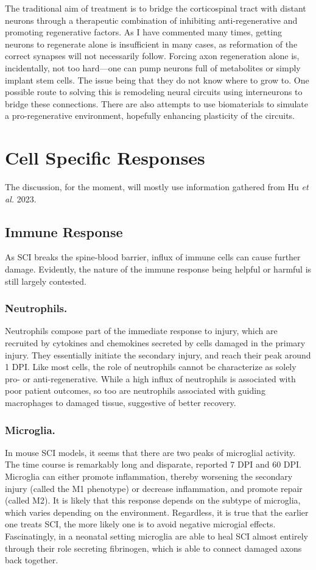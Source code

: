\documentclass[12pt]{report}
\begin{document}
The traditional aim of treatment is to bridge the corticospinal tract with distant neurons through a therapeutic combination of inhibiting anti-regenerative and promoting regenerative factors. As I have commented many times, getting neurons to regenerate alone is insufficient in many cases, as reformation of the correct synapses will not necessarily follow. Forcing axon regeneration alone is, incidentally, not too hard---one can pump neurons full of metabolites or simply implant stem cells. The issue being that they do not know where to grow to. One possible route to solving this is remodeling neural circuits using interneurons to bridge these connections. There are also attempts to use biomaterials to simulate a pro-regenerative environment, hopefully enhancing plasticity of the circuits.\newline


\section{Cell Specific Responses}
The discussion, for the moment, will mostly use information gathered from Hu \textit{et al.} 2023.


\subsection{Immune Response}
As SCI breaks the spine-blood barrier, influx of immune cells can cause further damage. Evidently, the nature of the immune response being helpful or harmful is still largely contested.

\subsubsection{Neutrophils.}
Neutrophils compose part of the immediate response to injury, which are recruited by cytokines and chemokines secreted by cells damaged in the primary injury. They essentially initiate the secondary injury, and reach their peak around 1 DPI. Like most cells, the role of neutrophils cannot be characterize as solely pro- or anti-regenerative. While a high influx of neutrophils is associated with poor patient outcomes, so too are neutrophils associated with guiding macrophages to damaged tissue, suggestive of better recovery. 

\subsubsection{Microglia.}
In mouse SCI models, it seems that there are two peaks of microglial activity. The time course is remarkably long and disparate, reported 7 DPI and 60 DPI. Microglia can either promote inflammation, thereby worsening the secondary injury (called the M1 phenotype) or decrease inflammation, and promote repair (called M2). It is likely that this response depends on the subtype of microglia, which varies depending on the environment. Regardless, it is true that the earlier one treats SCI, the more likely one is to avoid negative microgial effects. Fascinatingly, in a neonatal setting microglia are able to heal SCI almost entirely through their role secreting fibrinogen, which is able to connect damaged axons back together. 
\end{document}
